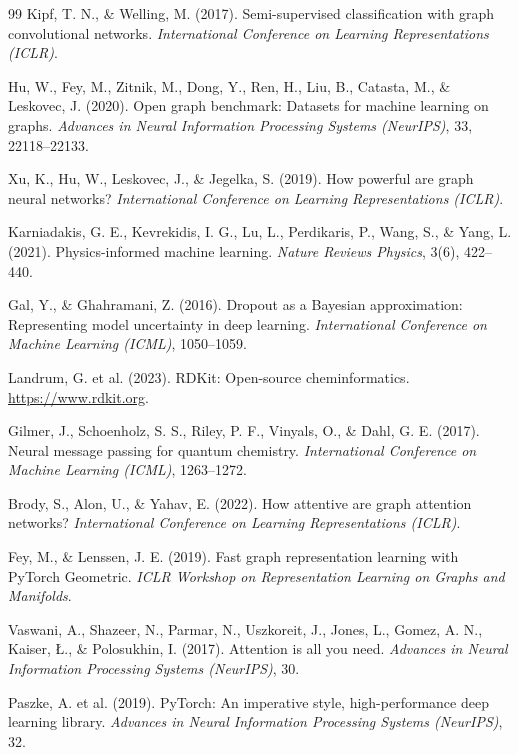 \documentclass[11pt]{article}
\begin{document}
\begin{thebibliography}{99}
 Kipf, T. N., \& Welling, M. (2017). Semi-supervised classification with graph convolutional networks. \textit{International Conference on Learning Representations (ICLR)}.

 Hu, W., Fey, M., Zitnik, M., Dong, Y., Ren, H., Liu, B., Catasta, M., \& Leskovec, J. (2020). Open graph benchmark: Datasets for machine learning on graphs. \textit{Advances in Neural Information Processing Systems (NeurIPS)}, 33, 22118--22133.

 Xu, K., Hu, W., Leskovec, J., \& Jegelka, S. (2019). How powerful are graph neural networks? \textit{International Conference on Learning Representations (ICLR)}.

 Karniadakis, G. E., Kevrekidis, I. G., Lu, L., Perdikaris, P., Wang, S., \& Yang, L. (2021). Physics-informed machine learning. \textit{Nature Reviews Physics}, 3(6), 422--440.

 Gal, Y., \& Ghahramani, Z. (2016). Dropout as a Bayesian approximation: Representing model uncertainty in deep learning. \textit{International Conference on Machine Learning (ICML)}, 1050--1059.

 Landrum, G. et al. (2023). RDKit: Open-source cheminformatics. \url{https://www.rdkit.org}.

 Gilmer, J., Schoenholz, S. S., Riley, P. F., Vinyals, O., \& Dahl, G. E. (2017). Neural message passing for quantum chemistry. \textit{International Conference on Machine Learning (ICML)}, 1263--1272.

 Brody, S., Alon, U., \& Yahav, E. (2022). How attentive are graph attention networks? \textit{International Conference on Learning Representations (ICLR)}.

 Fey, M., \& Lenssen, J. E. (2019). Fast graph representation learning with PyTorch Geometric. \textit{ICLR Workshop on Representation Learning on Graphs and Manifolds}.

 Vaswani, A., Shazeer, N., Parmar, N., Uszkoreit, J., Jones, L., Gomez, A. N., Kaiser, {\L}., \& Polosukhin, I. (2017). Attention is all you need. \textit{Advances in Neural Information Processing Systems (NeurIPS)}, 30.

 Paszke, A. et al. (2019). PyTorch: An imperative style, high-performance deep learning library. \textit{Advances in Neural Information Processing Systems (NeurIPS)}, 32.


\end{thebibliography}
\end{document}
